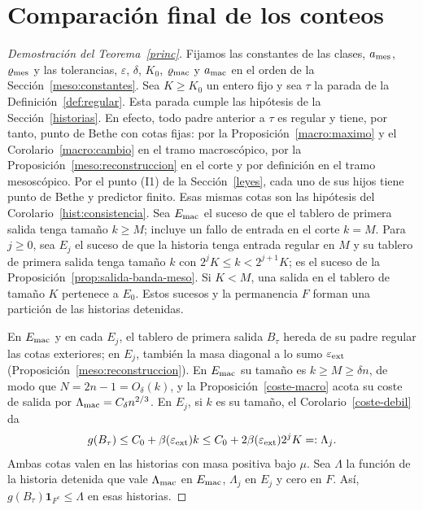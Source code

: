 \section{Comparación final de los conteos}\label{balance}

\begin{proof}[Demostración del Teorema~\ref{princ}]
Fijamos las constantes de las clases, $a_{\rm mes}$, $\varrho_{\rm mes}$ y las tolerancias,
$\varepsilon$, $\delta$, $K_0$, $\varrho_{\rm mac}$ y $a_{\rm mac}$ en el orden de la
Sección~\ref{meso:constantes}. Sea $K\ge K_0$ un entero fijo y sea $\tau$ la parada de la
Definición~\ref{def:regular}. Esta parada cumple las hipótesis de la Sección~\ref{historias}. En
efecto, todo padre anterior a $\tau$ es regular y tiene, por tanto, punto de Bethe con cotas fijas:
por la Proposición~\ref{macro:maximo} y el Corolario~\ref{macro:cambio} en el tramo macroscópico,
por la Proposición~\ref{meso:reconstruccion} en el corte y por definición en el tramo mesoscópico.
Por el punto (I1) de la Sección~\ref{leyes}, cada uno de sus hijos tiene punto de Bethe y predictor
finito. Esas mismas cotas son las hipótesis del Corolario~\ref{hist:consistencia}. Sea $E_{\rm mac}$ el
suceso de que el tablero de primera salida tenga
tamaño ${k\ge M}$; incluye un fallo de entrada en el corte $k=M$. Para $j\ge0$, sea $E_j$ el suceso
de que la historia tenga entrada regular en $M$ y su tablero de primera salida tenga tamaño $k$ con
${2^jK\le k<2^{j+1}K}$; es el suceso de la Proposición~\ref{prop:salida-banda-meso}. Si $K<M$, una
salida en el tablero de tamaño $K$ pertenece a $E_0$. Estos sucesos y la permanencia $F$ forman una
partición de las historias detenidas.

En $E_{\rm mac}$ y en cada $E_j$, el tablero de primera salida $B_\tau$ hereda de su padre regular
las cotas exteriores; en $E_j$, también la masa diagonal a lo sumo $\varepsilon_{\rm ext}$
(Proposición~\ref{meso:reconstruccion}). En $E_{\rm mac}$ su tamaño es $k\ge M\ge\delta n$, de modo
que $N=2n-1=O_\delta(k)$, y la Proposición~\ref{coste-macro} acota su coste de salida por
$\Lambda_{\rm mac}=C_\delta n^{2/3}$. En $E_j$, si $k$ es su tamaño, el Corolario~\ref{coste-debil}
da
\[
 g(B_\tau)\le C_0+\beta(\varepsilon_{\rm ext})k
           \le C_0+2\beta(\varepsilon_{\rm ext})2^jK=:\Lambda_j .
\]
Ambas cotas valen en las historias con masa positiva bajo $\mu$. Sea $\Lambda$ la función de la
historia detenida que vale $\Lambda_{\rm mac}$ en $E_{\rm mac}$, $\Lambda_j$ en $E_j$ y cero en $F$.
Así, $g(B_\tau)\mathbf1_{F^c}\le\Lambda$ en esas historias.


\end{proof}

